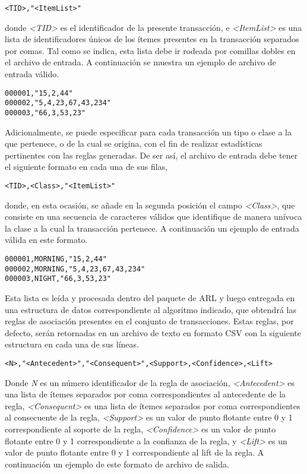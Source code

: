 \begin{lstlisting}[basicstyle=\ttfamily]
<TID>,"<ItemList>"
\end{lstlisting}

donde \textit{<TID>} es el identificador de la presente transacción, e \textit{<ItemList>} es una lista de identificadores únicos de los ítemes presentes en la transacción separados por comas. Tal como se indica, esta lista debe ir rodeada por comillas dobles en el archivo de entrada. A continuación se muestra un ejemplo de archivo de entrada válido.

\begin{lstlisting}[basicstyle=\ttfamily]
000001,"15,2,44"
000002,"5,4,23,67,43,234"
000003,"66,3,53,23"
\end{lstlisting}

Adicionalmente, se puede especificar para cada transacción un tipo o clase a la que pertenece, o de la cual se origina, con el fin de realizar estadísticas pertinentes con las reglas generadas. De ser así, el archivo de entrada debe tener el siguiente formato en cada una de sus filas,

\begin{lstlisting}[basicstyle=\ttfamily]
<TID>,<Class>,"<ItemList>"
\end{lstlisting}

donde, en esta ocasión, se añade en la segunda posición el campo \textit{<Class>}, que consiste en una secuencia de caracteres válidos que identifique de manera unívoca la clase a la cual la transacción pertenece. A continuación un ejemplo de entrada válida en este formato.

\begin{lstlisting}[basicstyle=\ttfamily]
000001,MORNING,"15,2,44"
000002,MORNING,"5,4,23,67,43,234"
000003,NIGHT,"66,3,53,23"
\end{lstlisting}

Esta lista es leída y procesada dentro del paquete de ARL y luego entregada en una estructura de datos correspondiente al algoritmo indicado, que obtendrá las reglas de asociación presentes en el conjunto de transacciones. Estas reglas, por defecto, serán retornadas en un archivo de texto en formato CSV con la siguiente estructura en cada una de sus líneas.

\begin{lstlisting}[basicstyle=\ttfamily]
<N>,"<Antecedent>","<Consequent>",<Support>,<Confidence>,<Lift>
\end{lstlisting}

Donde \textit{N} es un número identificador de la regla de asociación, \textit{<Antecedent>} es una lista de ítemes separados por coma correspondientes al antecedente de la regla, \textit{<Consequent>} es una lista de ítemes separados por coma correspondientes al consecuente de la regla, \textit{<Support>} es un valor de punto flotante entre 0 y 1 correspondiente al soporte de la regla, \textit{<Confidence>} es un valor de punto flotante entre 0 y 1 correspondiente a la confianza de la regla, y \textit{<Lift>} es un valor de punto flotante entre 0 y 1 correspondiente al lift de la regla. A continuación un ejemplo de este formato de archivo de salida.


